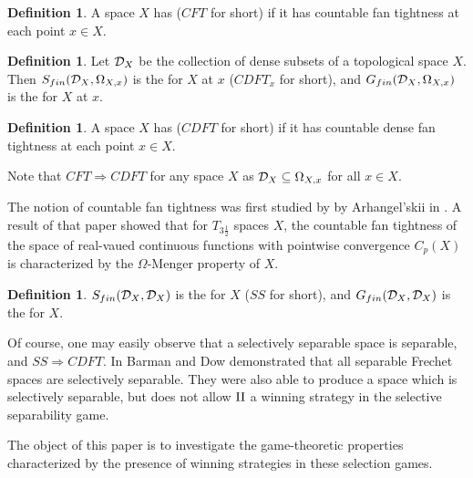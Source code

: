 \documentclass{amsart}
\theoremstyle{plain}
\theoremstyle{definition}
\newtheorem{definition}[theorem]{Definition}
\theoremstyle{remark}
\theoremstyle{plain}
\theoremstyle{definition}
\theoremstyle{remark}
\begin{document}
\begin{definition}
  A space \(X\) has  (\(CFT\) for short)
  if it has
  countable fan tightness at each point \(x\in X\).
\end{definition}

\begin{definition}
  Let \(\mathcal{D}_{X}\) be the collection of dense subsets of a topological
  space \(X\).
  Then \(S_{fin}(\mathcal{D}_X,\Omega_{X,x})\) is the
   for \(X\) at \(x\)
  (\(CDFT_x\) for short), and
  \(G_{fin}(\mathcal{D}_X,\Omega_{X,x})\) is the
   for \(X\) at \(x\).
\end{definition}

\begin{definition}
  A space \(X\) has 
  (\(CDFT\) for short) if it has
  countable dense fan tightness at each point \(x\in X\).
\end{definition}

Note that \(CFT\Rightarrow CDFT\) for any space \(X\) as
\(\mathcal{D}_X\subseteq \Omega_{X,x}\) for all \(x\in X\).

The notion of countable fan tightness was first studied by
by Arhangel'skii in \cite{MR837289}. A result of that paper showed
that for \(T_{3\frac{1}{2}}\) spaces \(X\), the countable fan tightness
of the space of real-vaued continuous functions with
pointwise convergence \(C_p(X)\) is characterized by
the \(\Omega\)-Menger property of \(X\).


\begin{definition}
  \(S_{fin}(\mathcal{D}_X,\mathcal{D}_X)\) is the
   for \(X\)
  (\(SS\) for short), and
  \(G_{fin}(\mathcal{D}_X,\mathcal{D}_X)\) is the
   for \(X\).
\end{definition}

Of course, one may easily observe that a selectively separable space is
separable, and \(SS\Rightarrow CDFT\).
In \cite{MR2678950} Barman and Dow demonstrated that all
separable Frechet spaces are selectively separable. They were also able
to produce a space which is selectively separable, but does not allow
\(\mathrm{II}\) a winning strategy in the selective separability game.

The object of this paper is to investigate the game-theoretic properties
characterized by the presence of winning 
strategies in these selection games.
\end{document}
